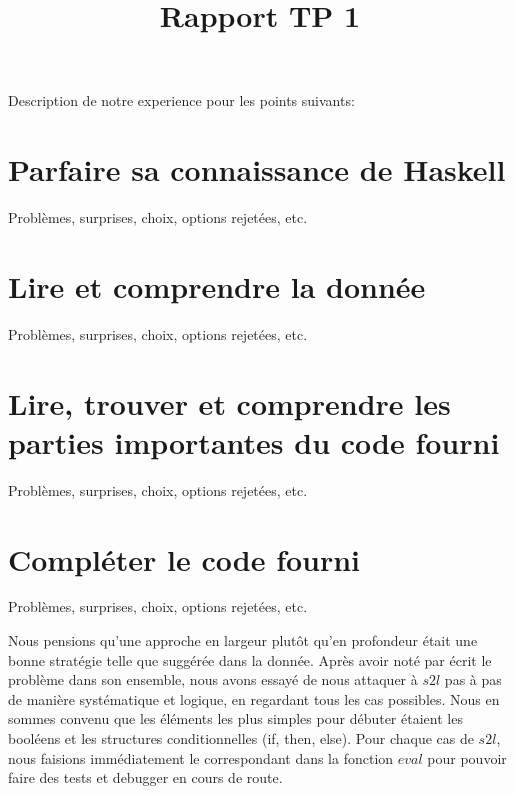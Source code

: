 \documentclass{article}
\title{Rapport TP 1}
\author {}
\begin{document}
Description de notre experience pour les points suivants:

\section{Parfaire sa connaissance de Haskell}

Problèmes, surprises, choix, options rejetées, etc.

\section{Lire et comprendre la donnée}

Problèmes, surprises, choix, options rejetées, etc.

\section{Lire, trouver et comprendre les parties importantes du code fourni}

Problèmes, surprises, choix, options rejetées, etc.


\section{Compléter le code fourni}
Problèmes, surprises, choix, options rejetées, etc.

Nous pensions qu'une approche en largeur plutôt qu'en profondeur était une bonne stratégie telle que suggérée dans la donnée. Après avoir noté par écrit le problème dans son ensemble, nous avons essayé de nous attaquer à $s2l$ pas à pas de manière systématique et logique, en regardant tous les cas possibles. Nous en sommes convenu que les éléments les plus simples pour débuter étaient les booléens et les structures conditionnelles (if, then, else). Pour chaque cas de $s2l$, nous faisions immédiatement le correspondant dans la fonction $eval$ pour pouvoir faire des tests et debugger en cours de route.
\end{document}
